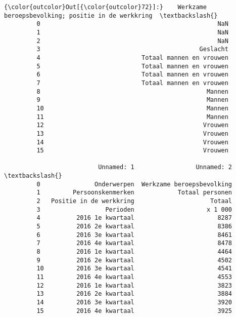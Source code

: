 \documentclass[11pt]{article}
\begin{document}
            \begin{Verbatim}[commandchars=\\\{\}]
{\color{outcolor}Out[{\color{outcolor}72}]:}    Werkzame beroepsbevolking; positie in de werkkring  \textbackslash{}
         0                                                 NaN   
         1                                                 NaN   
         2                                                 NaN   
         3                                            Geslacht   
         4                            Totaal mannen en vrouwen   
         5                            Totaal mannen en vrouwen   
         6                            Totaal mannen en vrouwen   
         7                            Totaal mannen en vrouwen   
         8                                              Mannen   
         9                                              Mannen   
         10                                             Mannen   
         11                                             Mannen   
         12                                            Vrouwen   
         13                                            Vrouwen   
         14                                            Vrouwen   
         15                                            Vrouwen   
         
                          Unnamed: 1                 Unnamed: 2  \textbackslash{}
         0               Onderwerpen  Werkzame beroepsbevolking   
         1         Persoonskenmerken            Totaal personen   
         2   Positie in de werkkring                     Totaal   
         3                  Perioden                    x 1 000   
         4          2016 1e kwartaal                       8287   
         5          2016 2e kwartaal                       8386   
         6          2016 3e kwartaal                       8461   
         7          2016 4e kwartaal                       8478   
         8          2016 1e kwartaal                       4464   
         9          2016 2e kwartaal                       4502   
         10         2016 3e kwartaal                       4541   
         11         2016 4e kwartaal                       4553   
         12         2016 1e kwartaal                       3823   
         13         2016 2e kwartaal                       3884   
         14         2016 3e kwartaal                       3920   
         15         2016 4e kwartaal                       3925   
         

\end{Verbatim}
\end{document}
